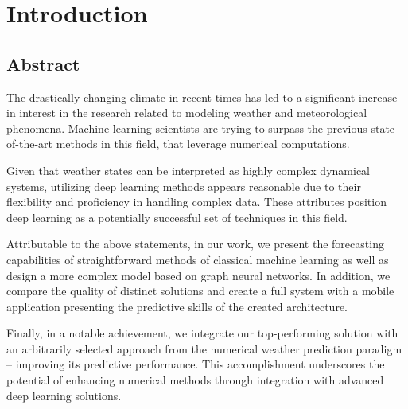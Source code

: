 
\chapter{Introduction}

\section{Abstract}
The drastically changing climate in recent times has led to a significant increase in interest in the research related to modeling weather and meteorological phenomena. Machine learning scientists are trying to surpass the previous state-of-the-art methods in this field, that leverage numerical computations. 

Given that weather states can be interpreted as highly complex dynamical systems, utilizing deep learning methods appears reasonable due to their flexibility and proficiency in handling complex data. These attributes position deep learning as a potentially successful set of techniques in this field.

Attributable to the above statements, in our work, we present the forecasting capabilities of straightforward methods of classical machine learning as well as design a more complex model based on graph neural networks. In addition, we compare the quality of distinct solutions and create a full system with a mobile application presenting the predictive skills of the created architecture. 

Finally, in a notable achievement, we integrate our top-performing solution with an arbitrarily selected approach from the numerical weather prediction paradigm -- improving its predictive performance. This accomplishment underscores the potential of enhancing numerical methods through integration with advanced deep learning solutions.

